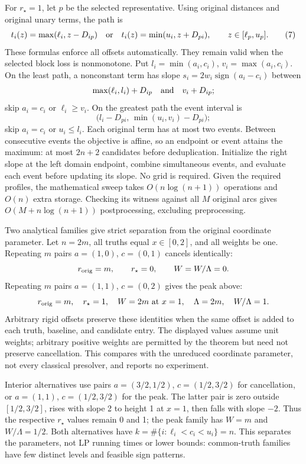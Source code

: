 For \(r_\star=1\), let \(p\) be the selected representative.
Using original distances and original unary terms, the path is
\[
 t_i(z)=\max(\ell_i,z-D_{ip})
 \quad\hbox{or}\quad
 t_i(z)=\min(u_i,z+D_{pi}),\qquad z\in[\ell_p,u_p].   \tag{7}
\]
These formulas enforce all offsets automatically. They remain
valid when the selected block loss is nonmonotone.
Put \(l_i=\min(a_i,c_i)\), \(v_i=\max(a_i,c_i)\).
On the least path, a nonconstant term has slope
\(s_i=2w_i\operatorname{sign}(a_i-c_i)\) between
\[
 \max(\ell_i,l_i)+D_{ip}\quad\hbox{and}\quad v_i+D_{ip};
\]
skip \(a_i=c_i\) or \(\ell_i\ge v_i\).
On the greatest path the event interval is
\[
 \bigl(l_i-D_{pi},\,\min(u_i,v_i)-D_{pi}\bigr);
\]
skip \(a_i=c_i\) or \(u_i\le l_i\).
Each original term has at most two events. Between consecutive
events the objective is affine, so an endpoint or event attains
the maximum: at most \(2n+2\) candidates before deduplication.
Initialize the right slope at the left domain endpoint, combine
simultaneous events, and evaluate each event before updating its
slope. No grid is required. Given the required profiles, the
mathematical sweep takes \(O(n\log(n+1))\) operations and \(O(n)\)
extra storage. Checking its witness against all \(M\) original arcs
gives \(O(M+n\log(n+1))\) postprocessing, excluding preprocessing.

Two analytical families give strict separation from the original
coordinate parameter. Let \(n=2m\), all truths equal
\(x\in[0,2]\), and all weights be one.
Repeating \(m\) pairs \(a=(1,0)\), \(c=(0,1)\) cancels identically:
\[
 r_{\rm orig}=m,\qquad r_\star=0,\qquad W=W/\Lambda=0.
\]
Repeating \(m\) pairs \(a=(1,1)\), \(c=(0,2)\) gives the peak above:
\[
 r_{\rm orig}=m,\quad r_\star=1,\quad
 W=2m\ \hbox{at }x=1,\quad \Lambda=2m,\quad W/\Lambda=1.
\]
Arbitrary rigid offsets preserve these identities when the same
offset is added to each truth, baseline, and candidate entry.
The displayed values assume unit weights; arbitrary positive
weights are permitted by the theorem but need not preserve
cancellation. This compares with the unreduced coordinate
parameter, not every classical presolver, and reports no experiment.

Interior alternatives use pairs \(a=(3/2,1/2)\), \(c=(1/2,3/2)\)
for cancellation, or \(a=(1,1)\), \(c=(1/2,3/2)\) for the peak.
The latter pair is zero outside \([1/2,3/2]\), rises with slope 2
to height 1 at \(x=1\), then falls with slope \(-2\).
Thus the respective \(r_\star\) values remain 0 and 1; the peak
family has \(W=m\) and \(W/\Lambda=1/2\).
Both alternatives have \(k=\#\{i:\ell_i<c_i<u_i\}=n\).
This separates the parameters, not LP running times or lower bounds:
common-truth families have few distinct levels and feasible sign patterns.

